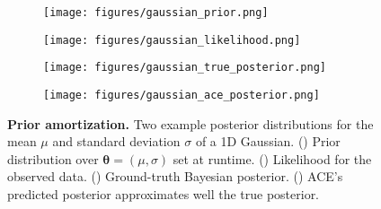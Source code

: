 \documentclass[twoside]{article}
\newcommand{\vtheta}{{\bm{\theta}}}
\begin{document}
\begin{figure}[t!]
    \centering
    \begin{subfigure}[t]{0.258\linewidth}
        \centering
        \texttt{[image: figures/gaussian\_prior.png]}
        \vspace{2pt}
        \caption{}
        \label{fig:prior_distribution}
    \end{subfigure}
    \hfill
    \begin{subfigure}[t]{0.215\linewidth}
        \centering
        \texttt{[image: figures/gaussian\_likelihood.png]}
        \vspace{2pt}
        \caption{}
        \label{fig:likelihood}
    \end{subfigure}
    \hfill
    \begin{subfigure}[t]{0.215\linewidth}
        \centering
        \texttt{[image: figures/gaussian\_true\_posterior.png]}
        \vspace{2pt}
        \caption{}
        \label{fig:true_posterior}
    \end{subfigure}
    \hfill
    \begin{subfigure}[t]{0.215\linewidth}
        \centering
        \texttt{[image: figures/gaussian\_ace\_posterior.png]}
        \vspace{2pt}
        \caption{}
        \label{fig:ace_predicted_posterior}
    \end{subfigure}
    \vspace{-12pt}
    \caption{\textbf{Prior amortization.} Two example posterior distributions for the mean $\mu$ and standard deviation $\sigma$ of a 1D Gaussian. () Prior distribution over $\vtheta = (\mu, \sigma)$ set at runtime. () Likelihood for the observed data. () Ground-truth Bayesian posterior. () ACE's predicted posterior approximates well the true posterior.}
    \label{fig:gaussian_examples_main}
    \vspace{-0.4cm}
\end{figure}
\end{document}
